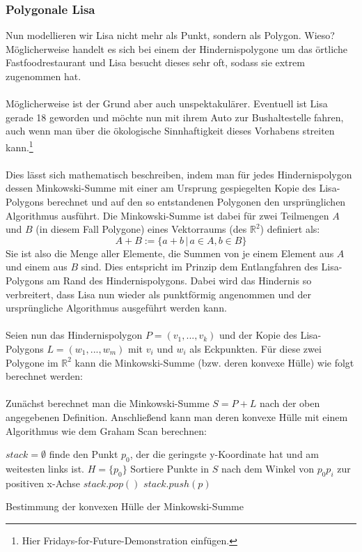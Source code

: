 \documentclass[a4paper, notitlepage, 12pt]{scrartcl}
\begin{document}
  \subsubsection{Polygonale Lisa}
 Nun modellieren wir Lisa nicht mehr als Punkt, sondern als Polygon. Wieso? Möglicherweise handelt es sich bei einem der Hindernispolygone um das örtliche Fastfoodrestaurant und Lisa besucht dieses sehr oft, sodass sie extrem zugenommen hat. \\ \\
 Möglicherweise ist der Grund aber auch unspektakulärer. Eventuell ist Lisa gerade 18 geworden und möchte nun mit ihrem Auto zur Bushaltestelle fahren, auch wenn man über die ökologische Sinnhaftigkeit dieses Vorhabens streiten kann.\footnote{Hier Fridays-for-Future-Demonstration einfügen.} \\ \\
 Dies lässt sich mathematisch beschreiben, indem man für jedes Hindernispolygon dessen Minkowski-Summe mit einer am Ursprung gespiegelten Kopie des Lisa-Polygons berechnet und auf den so entstandenen Polygonen den ursprünglichen Algorithmus ausführt. Die Minkowski-Summe ist dabei für zwei Teilmengen $A$ und $B$ (in diesem Fall Polygone) eines Vektorraums (des $\mathbb{R}^{2}$) definiert als:
 \begin{equation}
 A + B := \{a+b\,|\,a \in A, b \in B\}
 \end{equation}
 Sie ist also die Menge aller Elemente, die Summen von je einem Element aus $A$ und einem aus $B$ sind.\cite{Src:minkowski} Dies entspricht im Prinzip dem Entlangfahren des Lisa-Polygons am Rand des Hindernispolygons. Dabei wird das Hindernis so verbreitert, dass Lisa nun wieder als punktförmig angenommen und der ursprüngliche Algorithmus ausgeführt werden kann. \\ \\
 Seien nun das Hindernispolygon $P = (v_1,...,v_k)$ und der Kopie des Lisa-Polygons $L = (w_1,...,w_m)$ mit $v_i$ und $w_i$ als Eckpunkten. Für diese zwei Polygone im $\mathbb{R}^{2}$ kann die Minkowski-Summe (bzw. deren konvexe Hülle) wie folgt berechnet werden: \\ \\
 Zunächst berechnet man die Minkowski-Summe $S = P + L$ nach der oben angegebenen Definition. Anschließend kann man deren konvexe Hülle mit einem Algorithmus wie dem Graham Scan berechnen:
 \begin{algorithm}[H]
\begin{algorithmic}
	\State $stack = \emptyset$ 
	\State finde den Punkt $p_0$, der die geringste y-Koordinate hat und am weitesten links ist.
	\State $H = \{p_0\}$ 
	\State Sortiere Punkte in $S$ nach dem Winkel von $p_0p_i$ zur positiven x-Achse
	\State $stack.pop()$
	\EndWhile
	\State $stack.push(p)$
	\EndFor
	\EndFunction
\end{algorithmic}
\caption{Bestimmung der konvexen Hülle der Minkowski-Summe}
\end{algorithm}
\end{document}
